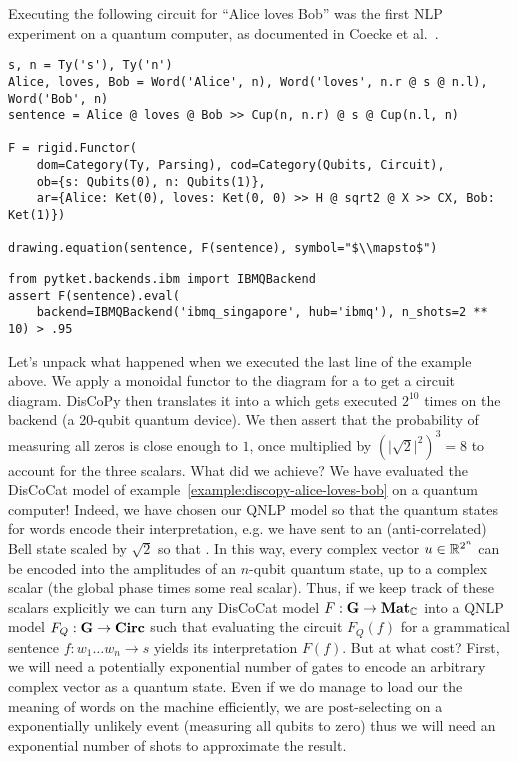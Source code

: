 \begin{example}
Executing the following circuit for ``Alice loves Bob'' was the first NLP experiment on a quantum computer, as documented in Coecke et al.~\cite{CoeckeEtAl20b}.

\begin{verbatim}
s, n = Ty('s'), Ty('n')
Alice, loves, Bob = Word('Alice', n), Word('loves', n.r @ s @ n.l), Word('Bob', n)
sentence = Alice @ loves @ Bob >> Cup(n, n.r) @ s @ Cup(n.l, n)

F = rigid.Functor(
    dom=Category(Ty, Parsing), cod=Category(Qubits, Circuit),
    ob={s: Qubits(0), n: Qubits(1)},
    ar={Alice: Ket(0), loves: Ket(0, 0) >> H @ sqrt2 @ X >> CX, Bob: Ket(1)})

drawing.equation(sentence, F(sentence), symbol="$\\mapsto$")
\end{verbatim}
\begin{verbatim}
from pytket.backends.ibm import IBMQBackend
assert F(sentence).eval(
    backend=IBMQBackend('ibmq_singapore', hub='ibmq'), n_shots=2 ** 10) > .95
\end{verbatim}
\end{example}

Let's unpack what happened when we executed the last line of the example above.
We apply a monoidal functor  to the diagram for a  to get a circuit diagram.
DisCoPy then translates it into a  which gets executed $2^{10}$ times on the  backend (a 20-qubit quantum device).
We then assert that the probability of measuring all zeros is close enough to $1$, once multiplied by $(\vert \sqrt{2} \vert^2)^3 = 8$ to account for the three scalars.
What did we achieve? We have evaluated the DisCoCat model of example~\ref{example:discopy-alice-loves-bob} on a quantum computer!
Indeed, we have chosen our QNLP model so that the quantum states for words encode their interpretation, e.g. we have sent  to an (anti-correlated) Bell state scaled by $\sqrt{2}$ so that  \py{= [[0, 1], [1, 0]]}.
In this way, every complex vector $u \in \mathbb{R}^{2^n}$ can be encoded into the amplitudes of an $n$-qubit quantum state, up to a complex scalar (the global phase times some real scalar).
Thus, if we keep track of these scalars explicitly we can turn any DisCoCat model $F : \mathbf{G} \to \mathbf{Mat}_{\mathbb{C}}$ into a QNLP model $F_Q : \mathbf{G} \to \mathbf{Circ}$ such that evaluating the circuit $F_Q(f)$ for a grammatical sentence $f : w_1 \dots w_n \to s$ yields its interpretation $F(f)$.
But at what cost?
First, we will need a potentially exponential number of gates to encode an arbitrary complex vector as a quantum state.
Even if we do manage to load our the meaning of words on the machine efficiently, we are post-selecting on a exponentially unlikely event (measuring all qubits to zero) thus we will need an exponential number of shots to approximate the result.

